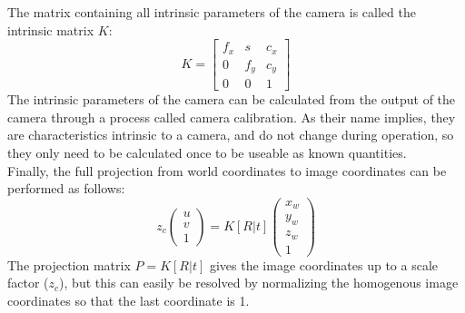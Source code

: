 The matrix containing all intrinsic parameters of the camera is called the intrinsic matrix $K$:
\begin{equation}
  K = \begin{bmatrix}
  f_x & s   & c_x \\
  0   & f_y & c_y \\
  0   & 0   & 1
\end{bmatrix}
\end{equation}
The intrinsic parameters of the camera can be calculated from the output of the camera through a process called camera calibration. As their name implies, they are characteristics intrinsic to a camera, and do not change during operation, so they only need to be calculated once to be useable as known quantities.\\

Finally, the full projection from world coordinates to image coordinates can be performed as follows:
\begin{equation}
  z_c\begin{pmatrix} u\\v\\1\end{pmatrix} =
    K[R|t]\begin{pmatrix} x_w\\y_w\\z_w\\1\end{pmatrix}
\end{equation}
The projection matrix $P = K[R|t]$ gives the image coordinates up to a scale factor ($z_c$), but this can easily be resolved by normalizing the homogenous image coordinates so that the last coordinate is 1.

